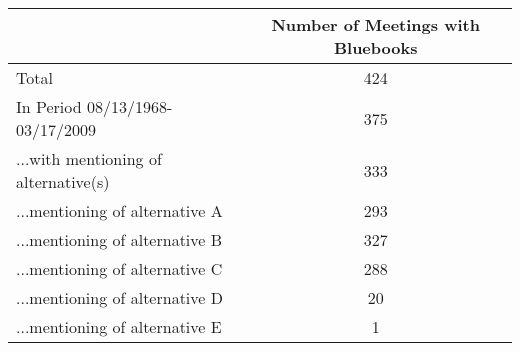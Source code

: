 \begin{tabular}{lc}
\hline\hline 
 & Number of Meetings with Bluebooks  \\ 
\hline 
Total & 424 \\ 
In Period 08/13/1968-03/17/2009 & 375 \\ 
...with mentioning of alternative(s) & 333 \\ 
...mentioning of alternative {A} & 293 \\ 
...mentioning of alternative {B} & 327 \\ 
...mentioning of alternative {C} & 288 \\ 
...mentioning of alternative {D} & 20 \\ 
...mentioning of alternative {E} & 1 \\ 
\hline 
\end{tabular}